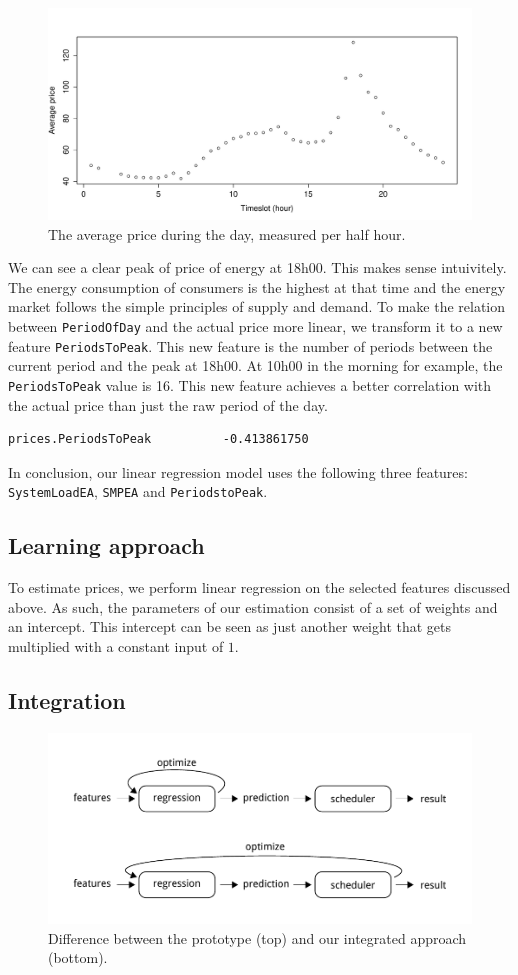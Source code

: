\documentclass{article}
\begin{document}
\begin{figure}
	\centering
	\includegraphics[width=.7\textwidth]{img/timeslot_averageprice.pdf}
	\caption{The average price during the day, measured per half hour.}
	\label{fig:timeslot_average}
\end{figure}

We can see a clear peak of price of energy at 18h00. This makes sense intuivitely. The energy consumption of consumers is the highest at that time and the energy market follows the simple principles of supply and demand. To make the relation between \verb|PeriodOfDay| and the actual price more linear, we transform it to a new feature \verb|PeriodsToPeak|. This new feature is the number of periods between the current period and the peak at 18h00. At 10h00 in the morning for example, the \verb|PeriodsToPeak| value is 16. This new feature achieves a better correlation with the actual price than just the raw period of the day.
\begin{verbatim}
prices.PeriodsToPeak          -0.413861750
\end{verbatim}
In conclusion, our linear regression model uses the following three features: \verb|SystemLoadEA|, \verb|SMPEA| and \verb|PeriodstoPeak|.

\subsection{Learning approach}
To estimate prices, we perform linear regression on the selected features discussed above. As such, the parameters of our estimation consist of a set of weights and an intercept. This intercept can be seen as just another weight that gets multiplied with a constant input of $1$.

\subsection{Integration}

\begin{figure}
	\centering
	\includegraphics[width=.9\textwidth]{img/feedback.pdf}
	\caption{Difference between the prototype (top) and our integrated approach (bottom).}
	\label{fig:feedback}
\end{figure}
\end{document}
